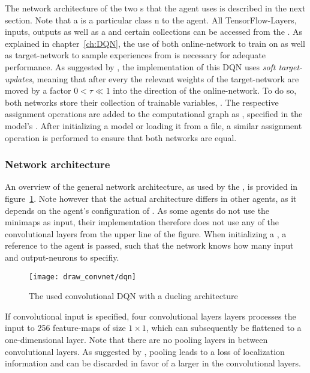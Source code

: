 The network architecture of the two s that the agent uses is described in the next section. Note that a  is a particular class n to the agent. All TensorFlow-Layers, inputs, outputs as well as a  and certain collections can be accessed from the . As explained in chapter~\ref{ch:DQN}, the use of both online-network to train on as well as target-network to sample experiences from is necessary for adequate performance. As suggested by \cite{lillicrap_continuous_2015}, the implementation of this DQN uses \textit{soft target-updates}, meaning that after every  the relevant weights of the target-network are moved by a factor $0 < \tau \ll 1$ into the direction of the online-network. To do so, both networks store their collection of trainable variables,  . The respective assignment operations are added to the computational graph as , specified in the model's . After initializing a model or loading it from a file, a similar assignment operation is performed to ensure that both networks are equal.

\subsubsection{Network architecture}

An overview of the general network architecture, as used by the , is provided in figure~\ref{fig:dqn_graph}. Note however that the actual architecture differs in other agents, as it depends on the agent's configuration of . As some agents do not use the minimaps as input, their implementation therefore does not use any of the convolutional layers from the upper line of the figure. When initializing a , a reference to the agent is passed, such that the network knows how many input and output-neurons to specifiy.

\begin{figure}[h]
	\centering 
	\texttt{[image: draw\_convnet/dqn]}
	\caption{The used convolutional DQN with a dueling architecture}
	\label{fig:dqn_graph}
\end{figure}

If convolutional input is specified, four convolutional layers layers processes the input to 256 feature-maps of size $1 \times 1$, which can subsequently be flattened to a one-dimensional layer. Note that there are no pooling layers in between convolutional layers. As suggested by \cite{springenberg_striving_2014}, pooling leads to a loss of localization information and can be discarded in favor of a larger  in the convolutional layers.


